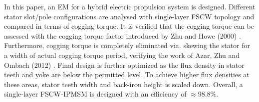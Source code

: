 \documentclass [a4 paper, 11pt, titlepage] {article}
\begin{document}
	In this paper, an EM for a hybrid electric propulsion system is designed. Different stator slot/pole configurations are analysed with single-layer FSCW topology and compared in terms of cogging torque. It is verified that the cogging torque can be assessed with the cogging torque factor introduced by Zhu and Howe (2000) \cite{zhu_influence_2000}. Furthermore, cogging torque is completely eliminated via. skewing the stator for a width of actual cogging torque period, verifying the work of Azar, Zhu and Ombach (2012) \cite{azar_influence_2012}. Final design is further optimized as the flux density in stator teeth and yoke are below the permitted level. To achieve higher flux densities at these areas, stator teeth width and back-iron height is scaled down. Overall, a single-layer FSCW-IPMSM is designed with an efficiency of $\approx98.8\%$.



	\newpage
	
	 
	
\end{document}
